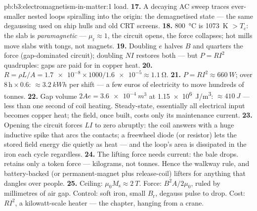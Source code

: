 \begin{solution}{pb:b3:electromagnetism-in-matter:1}
load.
\textbf{17.} A decaying AC sweep traces ever-smaller nested loops
spiralling into the origin: the demagnetised state --- the same
degaussing used on ship hulls and old CRT screens.
\textbf{18.} \qty{800}{\celsius} is \qty{1073}{K} $> T_{\text{c}}$:
the slab is \emph{paramagnetic} --- $\mu_{\text{r}} \approx 1$,
the circuit opens, the force collapses; hot mills move slabs with
tongs, not magnets.
\textbf{19.} Doubling $e$ halves $B$ and quarters the force
(gap-dominated circuit); doubling $NI$ restores both --- but
$P = RI^2$ quadruples: gaps are paid for in copper heat.
\textbf{20.} $R = \rho L/A = \num{1.7e-8}\times1000/
\num{1.6e-5} \approx \qty{1.1}{\ohm}$.
\textbf{21.} $P = RI^2 \approx \qty{660}{W}$; over
$8\,\text{h}\times0.6$: $\approx\qty{3.2}{kWh}$ per shift ---
a few euros of electricity to move hundreds of tonnes.
\textbf{22.} Gap volume $2Ae = \qty{3.6e-4}{m^3}$ at
\qty{1.15e6}{J/m^3}: $\approx\qty{410}{J}$ --- less than one
second of coil heating. Steady-state, essentially all electrical
input becomes copper heat; the field, once built, costs only its
maintenance current.
\textbf{23.} Opening the circuit forces $LI$ to zero abruptly:
the coil answers with a huge inductive spike that arcs the
contacts; a freewheel diode (or resistor) lets the stored field
energy die quietly as heat --- and the loop's area is dissipated
in the iron each cycle regardless.
\textbf{24.} The lifting force needs current: the bale drops.
 retains only a token force --- kilograms, not tonnes.
Hence the walkway rule, and battery-backed (or permanent-magnet
plus release-coil) lifters for anything that dangles over people.
\textbf{25.} Ceiling: $\mu_0M_{\text{s}} \approx \qty{2}{T}$.
Force: $B^2A/2\mu_0$, ruled by millimetres of air gap. Control:
soft iron, small $B_{\text{r}}$, degauss pulse to drop. Cost:
$RI^2$, a kilowatt-scale heater --- the chapter, hanging from a
crane.
\end{solution}
